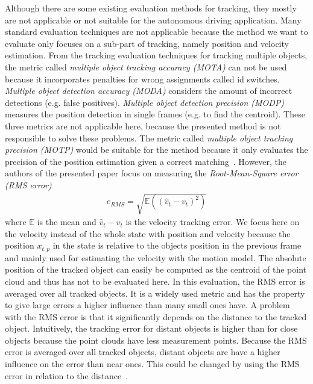 \documentclass[twoside,a4paper,article]{combine}
\begin{document}
Although there are some existing evaluation methods for tracking, they
mostly are not applicable or not suitable for the autonomous driving
application. Many standard evaluation techniques are not applicable
because the method we want to evaluate only focuses on a sub-part of
tracking, namely position and velocity estimation. From the tracking
evaluation techniques for tracking multiple objects, the metric called
\textit{multiple object tracking accuracy (MOTA)} can not be used
because it incorporates penalties for wrong assignments called id
switches. \textit{Multiple object detection accuracy (MODA)} considers
the amount of incorrect detections (e.g. false
positives). \textit{Multiple object detection precision (MODP)}
measures the position detection in single frames (e.g. to find the
centroid). These three metrics are not applicable here, because the
presented method is not responsible to solve these problems. The metric
called \textit{multiple object tracking precision (MOTP)} would be
suitable for the method because it only evaluates the precision of the
position estimation given a correct matching~\cite{mot,mot2}. However,
the authors of the presented paper focus on measuring the
\textit{Root-Mean-Square error (RMS error)}
\begin{align}
  e_{RMS}=\sqrt{\mathbb{E}((\hat{v}_t-v_t)^2)}
\end{align}
where $\mathbb{E}$ is the mean and $\hat{v}_t-v_t$ is the velocity
tracking error. We focus here on the velocity instead of the whole
state with position and velocity because the position $x_{t,p}$ in the
state is relative to the objects position in the previous frame and
mainly used for estimating the velocity with the motion model. The
absolute position of the tracked object can easily be computed as the
centroid of the point cloud and thus has not to be evaluated here. In
this evaluation, the RMS error is averaged over all tracked
objects. It is a widely used metric and has the property to give large errors a
higher influence than many small ones have. A problem with the RMS
error is that it significantly depends on the distance to the tracked 
object. Intuitively, the
tracking error for distant objects is higher than for close
objects because the point clouds have less measurement
points. Because the RMS error is averaged over all tracked objects,
distant objects are have a higher influence on the error than near
ones. This could be changed by using the RMS error in relation to the
distance~\cite{paper}.
\end{document}
